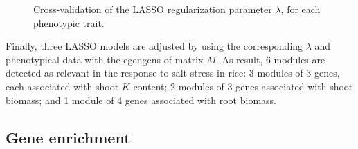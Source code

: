 \begin{figure}[htpb]
  \centering
  \caption{Cross-validation of the LASSO regularization parameter
    $\lambda$, for each phenotypic trait.}
  \label{fig:cross-val}
\end{figure}

Finally, three LASSO models are adjusted by using the corresponding
$\lambda$ and phenotypical data with the egengens of matrix $M$. As
result, 6 modules are detected as relevant in the response to salt
stress in rice: 3 modules of 3 genes, each associated with shoot
$K$ content; 2 modules of 3 genes associated with shoot biomass; and 1
module of 4 genes associated with root biomass.

\subsection{Gene enrichment}

